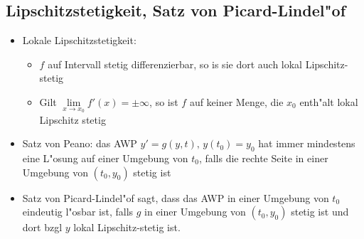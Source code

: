 \documentclass[fleqn,12pt]{scrartcl}
\begin{document}
\subsection{Lipschitzstetigkeit, Satz von Picard-Lindel"of}
\begin{itemize}
	\item
		Lokale Lipschitzstetigkeit:
		\begin{itemize}
			\item
				$f$ auf Intervall stetig differenzierbar, so is sie dort auch lokal Lipschitz-stetig
			\item
				Gilt $\lim\limits_{x\rightarrow x_0}{f'(x)} = \pm \infty$, so ist $f$ auf keiner Menge, die $x_0$ enth"alt lokal Lipschitz stetig
		\end{itemize}

	\item
		Satz von Peano: das AWP $y' = g(y,t), \, y(t_0) = y_0$ hat immer mindestens eine L"osung auf einer Umgebung von $t_0$, falls die rechte Seite in einer Umgebung von $(t_0, y_0)$ stetig ist
	\item
		Satz von Picard-Lindel"of  sagt, dass das AWP in einer Umgebung von $t_0$ eindeutig l"osbar ist,
		falls $g$ in einer Umgebung von $(t_0, y_0)$ stetig ist und dort bzgl $y$ lokal Lipschitz-stetig ist.
\end{itemize}
\end{document}
